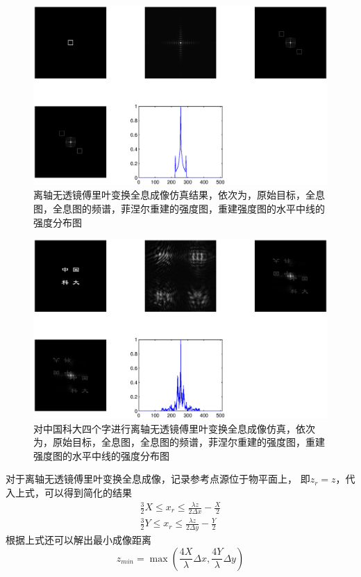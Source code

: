 \documentclass[11pt,a4paper]{article}
\begin{document}
\begin{figure}[htb]
  \centering
  \includegraphics[width=\textwidth]{kuang_sphere.eps}
  \caption{离轴无透镜傅里叶变换全息成像仿真结果，依次为，原始目标，全息图，全息图的频谱，菲涅尔重建的强度图，重建强度图的水平中线的强度分布图}
  \label{fig:res_kuang_sphere}
\end{figure}

\begin{figure}[htb]
  \centering
  \includegraphics[width=\textwidth]{zkd.eps}
  \caption{对中国科大四个字进行离轴无透镜傅里叶变换全息成像仿真，依次为，原始目标，全息图，全息图的频谱，菲涅尔重建的强度图，重建强度图的水平中线的强度分布图}
  \label{fig:res_kuang_sphere}
\end{figure}



对于离轴无透镜傅里叶变换全息成像，记录参考点源位于物平面上，
即$z_r=z$，代入上式，可以得到简化的结果
\begin{equation}
\begin{split}
\frac{3}{2}X\le x_r\le\frac{\lambda z}{2\Delta x} - \frac{X}{2} \\
\frac{3}{2}Y\le x_r\le\frac{\lambda z}{2\Delta y} - \frac{Y}{2} 
\end{split}
\end{equation}
根据上式还可以解出最小成像距离
\begin{equation}
z_{min} = \max(\frac{4X}{\lambda}\Delta x, \frac{4Y}{\lambda} \Delta y )
\end{equation}
\end{document}
